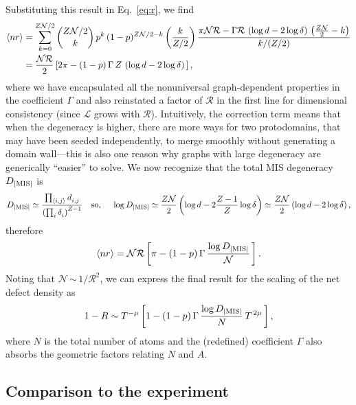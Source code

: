 \documentclass[twocolumn,amssymb,secnumarabic, prl, aps, nofootinbib]{revtex4-1}
\newcommand{\mc}{\mathcal}
\newcommand{\DMIS}{D_{|\textnormal{MIS}|}}
\begin{document}
Substituting this result in Eq.~\eqref{eq:r}, we find
\begin{alignat}{1}
	\nonumber\langle n r \rangle &= \sum_{k=0}^{Z \mc{N}/2 }{\dbinom{Z \mc{N}/2}{k}}\, p^k\, (1-p)^{Z \mc{N}/2-k} \left(\frac{k}{Z/2} \right)\frac{\pi \mc{N} \mc{R}-\Gamma  \mc{R}\, \left(\log d - 2 \log \delta\right)\, \left(\frac{Z \mc{N}}{2}-k\right)}{k/ (Z/2)}\\
	& = \frac{\mc{N} \mc{R}}{2} \left[2 \pi - (1-p)\,\Gamma\,Z\, \left(\log d - 2 \log \delta\right)\, \right],
\end{alignat}
where we have encapsulated all the nonuniversal graph-dependent properties in the coefficient $\Gamma$ and also reinstated a factor of $\mc{R}$ in the first line for dimensional consistency (since $\mc{L}$ grows with $\mc{R}$). Intuitively, the correction term means that when the degeneracy is higher, there are more ways for two protodomains, that may have been seeded independently, to merge smoothly without generating a domain wall---this is also one reason why graphs with large degeneracy are generically ``easier'' to solve. We now recognize that the total MIS degeneracy $\DMIS$ is 
\begin{equation}
	\DMIS \simeq \frac{\prod_{\langle i, j \rangle} d^{}_{i,j}}{\left(\prod_{i} \delta^{}_i \right)^{Z-1}} \quad \mbox{so, } \quad \log \DMIS \simeq \frac{Z \mc{N}}{2} \left(\log d - 2 \frac{Z-1}{Z} \log \delta \right) \simeq \frac{Z \mc{N}}{2} \left(\log d - 2 \log \delta \right),
\end{equation}
therefore
\begin{equation}
	\langle n r \rangle  = \mc{N} \mc{R} \left[\pi - (1-p)\, \Gamma \,\frac{\log \DMIS}{\mc{N}}\, \right].
\end{equation}
Noting that $\mc{N}$\,$\sim$\,$1/\mc{R}^2$, we can express the final result for the scaling of the net defect density as
\begin{equation}
	1-R \sim  T^{-\mu} \left[1 - (1-p)\, \Gamma \,\frac{\log \DMIS}{N}\,T^{\,2 \mu}\, \right],
	\label{eq:scaling}
\end{equation}
where $N$ is the total number of atoms and the (redefined) coefficient $\Gamma$ also absorbs the geometric factors relating $N$ and $A$.



\subsection{Comparison to the experiment}
\label{sec:exp}
\end{document}
